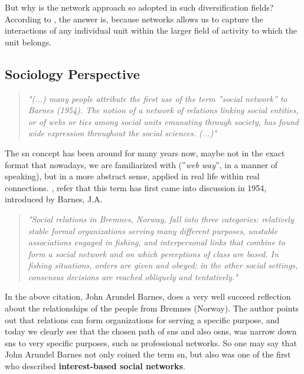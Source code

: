 \indent But why is the network approach so adopted in such diversification fields? According to \cite{kilduff2003social}, the answer is, because networks allows us to capture the interactions of any individual unit within the larger field of activity to which the unit belongs.

\subsection{Sociology Perspective}
\begin{quote}
\textit{"(...) many people attribute the first use of the term ''social network'' to
Barnes (1954). The notion of a network of relations linking social entities, or of webs or ties among social units emanating through society, has
found wide expression throughout the social sciences. (...)"}
\cite{wasserman1994social}
\end{quote}

The \gls{sn} concept has been around for many years now, maybe not in the exact format that nowadays, we are familiarized with (''\textit{web way}'', in a manner of speaking), but in a more abstract sense, applied in real life within real connections.
\cite{wasserman1994social}, refer that this term has first came into discussion in 1954, introduced by Barnes, J.A.

\begin{quote}
\textit{"Social relations in Bremnes, Norway, fall into three categories: relatively stable formal organizations serving many different
purposes, unstable associations engaged in fishing, and interpersonal links that combine to form a social
network and on which perceptions of class are based. In fishing situations, orders are given and
obeyed; in the other social settings, consensus decisions are reached obliquely and tentatively."}
\cite{barnes1954class}
\end{quote}

In the above citation, John Arundel Barnes, does a very well succeed reflection about the relationships of the people from Bremnes (Norway).
The author points out that relations can form organizations for serving a specific purpose, and today we clearly see that the chosen path of
\glspl{sn} and also \glspl{osn}, was narrow down \glspl{sn} to very specific purposes, such as professional networks. So one may say that John
Arundel Barnes not only coined the term \gls{sn}, but also was one of the first who described \textbf{interest-based social networks}.


